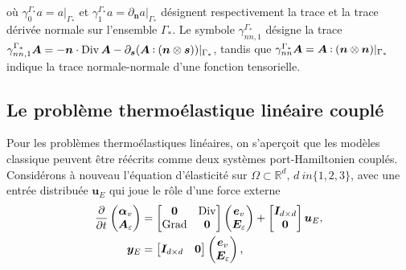 où $ \gamma_{0}^{\Gamma_*} a = a \vert_{\Gamma_*} $ et $ \gamma_{1}^{\Gamma_*} a = \partial_{\bm{n}} a \vert_{\Gamma_*} $ désignent respectivement la trace et la trace dérivée normale sur l'ensemble $\Gamma_*$. Le symbole $\gamma_{nn, 1}^{\Gamma_*}$ désigne la trace $\gamma_{nn, 1}^{\Gamma_*} \bm{A} = -\bm{n} \cdot \Div \bm{A} - \partial_{\bm{s}} (\bm{A} \cddot (\bm{n} \otimes \bm{s})) \vert_{\Gamma_*}$, tandis que $\gamma_{nn}^{\Gamma_*} \bm{A} = \bm{A} \cddot (\bm{n} \otimes \bm{n}) \vert_{\Gamma_*} $ indique la  trace normale-normale d'une fonction tensorielle. 

\subsection*{Le problème thermoélastique linéaire couplé}
Pour les problèmes thermoélastiques linéaires, on s'aperçoit que les modèles classique peuvent être réécrits comme deux systèmes port-Hamiltonien couplés. Considérons à nouveau l'équation d'élasticité sur $\Omega \subset \mathbb{R}^d, \, d \ in \{1, 2, 3 \} $, avec une entrée distribuée $\bm{u}_E$ qui joue le rôle d'une force externe
\begin{equation*}
\begin{aligned}
\diffp{}{t}
\begin{pmatrix}
\bm{\alpha}_v \\
\bm{A}_{\varepsilon} \\
\end{pmatrix} &= 
\begin{bmatrix}
\bm{0} & \Div \\
\Grad & \bm{0} \\
\end{bmatrix}
\begin{pmatrix}
\bm{e}_v \\
\bm{E}_{\varepsilon} \\
\end{pmatrix} + 
\begin{bmatrix}
\bm{I}_{d\times d} \\
\bm{0} \\
\end{bmatrix}\bm{u}_E, \\
\bm{y}_E &= \begin{bmatrix}
\bm{I}_{d\times d} & \bm{0} \\
\end{bmatrix}
\begin{pmatrix}
\bm{e}_v \\
\bm{E}_{\varepsilon}
\end{pmatrix},
\end{aligned}
\end{equation*}

